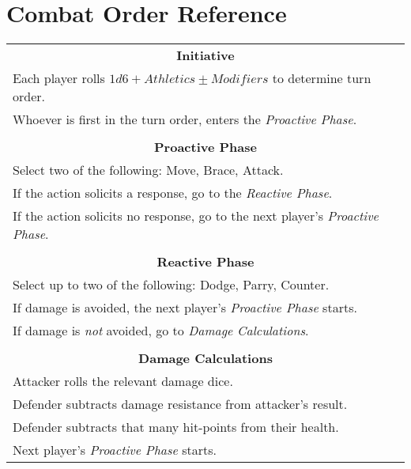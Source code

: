 \section{Combat Order Reference}\label{sec:combat-order}
\begin{center}
\begin{tabular}{l}
    \multicolumn{1}{c}{\textbf{Initiative}}\\
    Each player rolls $1d6 + Athletics \pm Modifiers$ to determine turn order.\\
    Whoever is first in the turn order, enters the \textit{Proactive Phase}.\\\hline\\
    \multicolumn{1}{c}{\textbf{Proactive Phase}}\\
    Select two of the following: Move, Brace, Attack.\\
    If the action solicits a response, go to the \textit{Reactive Phase}.\\
    If the action solicits no response, go to the next player's \textit{Proactive Phase}.\\\hline\\
    \multicolumn{1}{c}{\textbf{Reactive Phase}}\\
    Select up to two of the following: Dodge, Parry, Counter.\\
    If damage is avoided, the next player's \textit{Proactive Phase} starts.\\
    If damage is \textit{not} avoided, go to \textit{Damage Calculations}.\\\hline\\
    \multicolumn{1}{c}{\textbf{Damage Calculations}}\\
    Attacker rolls the relevant damage dice.\\
    Defender subtracts damage resistance from attacker's result.\\
    Defender subtracts that many hit-points from their health.\\
    Next player's \textit{Proactive Phase} starts.\\
\end{tabular}
\end{center}